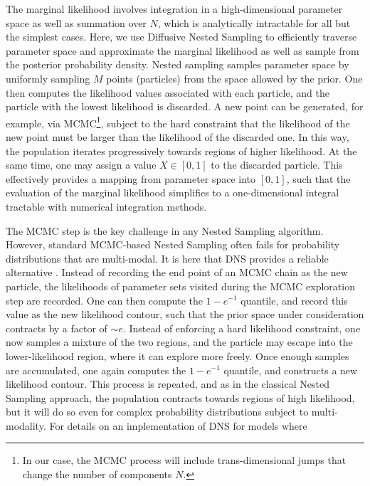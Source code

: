 \documentclass[12pt]{emulateapj}
\begin{document}

The marginal likelihood involves integration in a high-dimensional parameter space as well as summation over $N$, which is analytically intractable for all but the
simplest cases. Here, we use Diffusive Nested Sampling \citep[DNS; ]{brewer2011} to efficiently traverse parameter space and approximate the marginal 
likelihood as well as sample from the posterior probability density. 
Nested sampling \citep{skilling2006} samples parameter space by uniformly sampling $M$ points (particles) from the space allowed by the prior. 
One then computes the likelihood values associated with each particle, and the particle with the lowest likelihood is discarded. A new point
can be generated, for example, via MCMC\footnote{In our case, the MCMC process will include trans-dimensional jumps that change the number of components $N$.}, subject to the hard constraint that the
likelihood of the new point must be larger than the likelihood of the discarded one. In this way, the population iterates progressively towards
regions of higher likelihood. At the same time, one may assign a value $X  \in [0, 1]$ to the discarded particle. This effectively provides a 
mapping from parameter space into $[0,1]$, such that the evaluation of the marginal likelihood simplifies to a one-dimensional 
integral tractable with numerical integration methods.

The MCMC step is the key challenge in any Nested Sampling algorithm. However, standard MCMC-based Nested Sampling often fails for probability distributions that
are multi-modal. It is here that DNS provides a reliable alternative \citep[for details, see][]{brewer2011}. 
Instead of recording the end point of an MCMC chain as the new particle, the likelihoods of parameter sets visited during the MCMC exploration step
 are recorded. One can then compute the $1-e^{-1}$ quantile, and record this value as the new likelihood contour, such that the prior space
 under consideration contracts by a factor of $\sim e$. Instead of enforcing a hard likelihood constraint, one now samples a mixture of the 
 two regions, and the particle may escape into the lower-likelihood region, where it can explore more freely. Once enough samples are accumulated,
 one again computes the $1-e^{-1}$ quantile, and constructs a new likelihood contour. This process is repeated, and as in the classical Nested Sampling
 approach, the population contracts towards regions of high likelihood, but it will do so even for complex probability distributions subject to multi-modality.
 For details on an implementation of DNS for models where 
\end{document}
